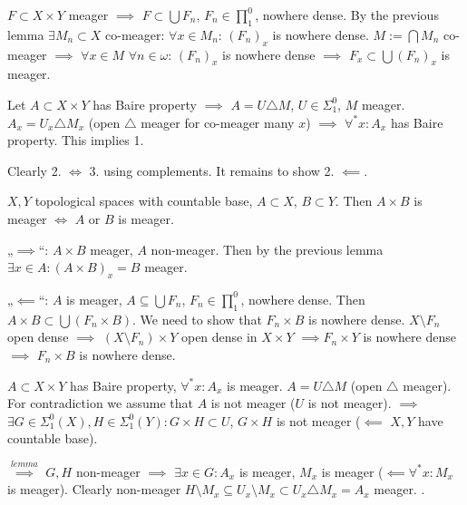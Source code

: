 \documentclass[12pt]{article}					%
\begin{document}
\begin{dukazin}
	$F \subset X \times Y$ meager $\implies$ $F \subset \bigcup F_n$, $F_n \in ∏_1^0$, nowhere dense. By the previous lemma $\exists M_n \subset X$ co-meager: $\forall x \in M_n$: $(F_n)_x$ is nowhere dense. $M := \bigcap M_n$ co-meager $\implies$ $\forall x \in M$ $\forall n \in ω$: $(F_n)_x$ is nowhere dense $\implies$ $F_x \subset \bigcup (F_n)_x$ is meager.

	Let $A \subset X \times Y$ has Baire property $\implies$ $A = U \triangle M$, $U \in Σ_1^0$, $M$ meager. $A_x = U_x \triangle M_x$ (open $\triangle$ meager for co-meager many $x$) $\implies$ $\forall^* x: A_x$ has Baire property. This implies 1.

	Clearly 2. $\Leftrightarrow$ 3. using complements. It remains to show 2. $\impliedby$.
\end{dukazin}

\begin{lemma}
	$X, Y$ topological spaces with countable base, $A \subset X$, $B \subset Y$. Then $A \times B$ is meager $\Leftrightarrow$ $A$ or $B$ is meager.

	\begin{dukazin}
		„$\implies$“: $A \times B$ meager, $A$ non-meager. Then by the previous lemma $\exists x \in A: (A \times B)_x = B$ meager.

		„$\impliedby$“: $A$ is meager, $A \subseteq \bigcup F_n$, $F_n \in ∏_1^0$, nowhere dense. Then $A \times B \subset \bigcup(F_n \times B)$. We need to show that $F_n \times B$ is nowhere dense. $X \setminus F_n$ open dense $\implies$ $(X \setminus F_n) \times Y$ open dense in $X \times Y$ $\implies F_n \times Y$ is nowhere dense $\implies$ $F_n \times B$ is nowhere dense.
	\end{dukazin}
\end{lemma}


\begin{dukazin}
	$A \subset X \times Y$ has Baire property, $\forall^* x: A_x$ is meager. $A = U \triangle M$ (open $\triangle$ meager). For contradiction we assume that $A$ is not meager ($U$ is not meager). $\implies$ $\exists G \in Σ_1^0(X), H \in Σ_1^0(Y): G \times H \subset U$, $G \times H$ is not meager ($\impliedby$ $X, Y$ have countable base).

	$\overset{lemma}\implies$ $G, H$ non-meager $\implies$ $\exists x \in G: A_x$ is meager, $M_x$ is meager ($\impliedby \forall^* x : M_x$ is meager). Clearly non-meager $H \setminus M_x \subseteq U_x \setminus M_x \subset U_x \triangle M_x = A_x$ meager. \lightning.
\end{dukazin}
\end{document}
